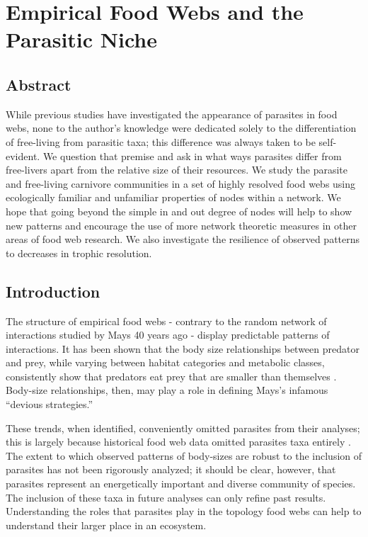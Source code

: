 \documentclass[../dissertation.tex]{subfiles}
\title{}
\begin{document}
\maketitle

\chapter{Empirical Food Webs and the Parasitic Niche}

\section{Abstract}
While previous studies have investigated the appearance of parasites in food
webs, none to the author's knowledge were dedicated solely to the
differentiation of free-living from parasitic taxa; this difference was always
taken to be self-evident. We question that premise and ask in what ways
parasites differ from free-livers apart from the relative size of their
resources. We study the parasite and free-living carnivore communities in a set
of highly resolved food webs using ecologically familiar and unfamiliar
properties of nodes within a network. We hope that going beyond the simple in
and out degree of nodes will help to show new patterns and encourage the use of
more network theoretic measures in other areas of food web research. We also
investigate the resilience of observed patterns to decreases in trophic
resolution.

\section{Introduction}

The structure of empirical food webs - contrary to the random network of interactions
studied by Mays 40 years ago - display predictable patterns of interactions.
It has been shown that the body size relationships between predator and prey,
while varying between habitat categories and metabolic classes, consistently
show that predators eat prey that are smaller than themselves
\cite{Brose2006b}. Body-size relationships, then, may play a role in defining
Mays's infamous ``devious strategies.'' 

These trends, when identified, conveniently omitted parasites from their
analyses; this is largely because historical food web data omitted parasites
taxa entirely \cite{Marcogliese1997}. The extent to which observed patterns of
body-sizes are robust to the inclusion of parasites has not been rigorously
analyzed; it should be clear, however, that parasites represent an
energetically important and diverse community of species. The inclusion of
these taxa in future analyses can only refine past results. Understanding the
roles that parasites play in the topology food webs can help to understand
their larger place in an ecosystem.
\end{document}
